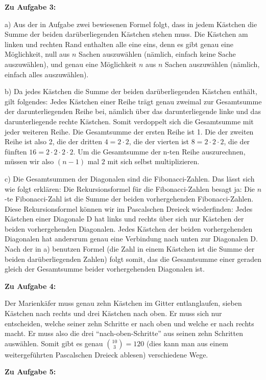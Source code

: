 \documentclass{article}
\begin{document}
\textbf{Zu Aufgabe 3:}

a) Aus der in Aufgabe zwei bewiesenen Formel folgt, dass in jedem Kästchen die Summe der beiden darüberliegenden Kästchen stehen muss. Die Kästchen am linken und rechten Rand enthalten alle eine eins, denn es gibt genau eine Möglichkeit, null aus $n$ Sachen auszuwählen (nämlich, einfach keine Sache auszuwählen), und genau eine Möglichkeit $n$ aus $n$ Sachen auszuwählen (nämlich, einfach alles auszuwählen).

b) Da jedes Kästchen die Summe der beiden darüberliegenden Kästchen enthält, gilt folgendes: Jedes Kästchen einer Reihe trägt genau zweimal zur Gesamtsumme der darunterliegenden Reihe bei, nämlich über das darunterliegende linke und das darunterliegende rechte Kästchen. Somit verdoppelt sich die Gesamtsumme mit jeder weiteren Reihe. Die Gesamtsumme der ersten Reihe ist 1. Die der zweiten Reihe ist also 2, die der dritten $4 = 2 \cdot 2$, die der vierten ist $8 = 2 \cdot 2 \cdot 2$, die der fünften $16 = 2 \cdot 2 \cdot 2 \cdot 2$. Um die Gesamtsumme der n-ten Reihe auszurechnen, müssen wir also $(n-1)$ mal $2$ mit sich selbst multiplizieren.

c) Die Gesamtsummen der Diagonalen sind die Fibonacci-Zahlen. Das lässt sich wie folgt erklären: Die Rekursionsformel für die Fibonacci-Zahlen besagt ja: Die $n$-te Fibonacci-Zahl ist die Summe der beiden vorhergehenden Fibonacci-Zahlen. Diese Rekursionsformel können wir im Pascalschen Dreieck wiederfinden: Jedes Kästchen einer Diagonale D hat links und rechts über sich nur Kästchen der beiden vorhergehenden Diagonalen. Jedes Kästchen der beiden vorhergehenden Diagonalen hat andersrum genau eine Verbindung nach unten zur Diagonalen D. Nach der in a) benutzen Formel (die Zahl in einem Kästchen ist die Summe der beiden darüberliegenden Zahlen) folgt somit, das die Gesamtsumme einer geraden gleich der Gesamtsumme beider vorhergehenden Diagonalen ist.


\textbf{Zu Aufgabe 4:}

Der Marienkäfer muss genau zehn Kästchen im Gitter entlanglaufen, sieben Kästchen nach rechts und drei Kästchen nach oben. Er muss sich nur entscheiden, welche seiner zehn Schritte er nach oben und welche er nach rechts macht. Er muss also die drei "`nach-oben-Schritte"' aus seinen zehn Schritten auswählen. Somit gibt es genau $\binom{10}{3} = 120$ (dies kann man aus einem weitergeführten Pascalschen Dreieck ablesen) verschiedene Wege.


\textbf{Zu Aufgabe 5:}
\end{document}
